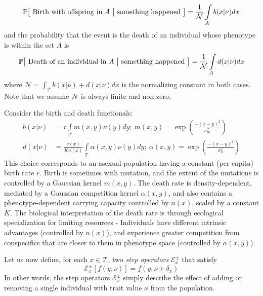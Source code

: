 \begin{equation*}
    \mathbb{P}\big[\textrm{ Birth with offspring in $A$ } \big{|} \textrm{ something happened }\big] = \frac{1}{\mathcal{N}}\int\limits_{A}b(x|\nu)dx
\end{equation*}
and the probability that the event is the death of an individual whose phenotype is within the set $A$ is
\begin{equation*}
    \mathbb{P}\big[\textrm{ Death of an individual in $A$ } \big{|} \textrm{ something happened }\big] = \frac{1}{\mathcal{N}}\int\limits_{A}d(x|\nu)dx
\end{equation*}
where $\mathcal{N} = \int_{\mathcal{T}}b(x|\nu)+d(x|\nu)dx$ is the normalizing constant in both cases. Note that we assume $\mathcal{N}$ is always finite and non-zero.

\begin{example}
Consider the birth and death functionals:
\begin{equation}
\label{Rogers_logistic_BD}
\begin{aligned}
b(x|\nu) &= r\int\limits_{\mathcal{T}}m(x,y)\nu(y)dy; \ m(x,y) = \exp\left(\frac{-(x-y)^2}{\sigma_{m}^{2}}\right)\\
    d(x|\nu) &= \frac{\nu(x)}{Kn(x)}\int\limits_{\mathcal{T}}\alpha(x,y)\nu(y)dy; \ \alpha(x,y) = \exp\left(\frac{-(x-y)^2}{\sigma_{\alpha}^{2}}\right)
\end{aligned}
\end{equation}
This choice corresponds to an asexual population having a constant (per-capita) birth rate $r$. Birth is sometimes with mutation, and the extent of the mutations is controlled by a Gaussian kernel $m(x,y)$. The death rate is density-dependent, mediated by a Gaussian competition kernel $\alpha(x,y)$, and also contains a phenotype-dependent carrying capacity controlled by $n(x)$, scaled by a constant $K$. The biological interpretation of the death rate is through ecological specialization for limiting resources - Individuals have different intrinsic advantages (controlled by $n(x)$), and experience greater competition from conspecifics that are closer to them in phenotype space (controlled by $\alpha(x,y)$).
\end{example}
Let us now define, for each $x \in \mathcal{T}$, two \emph{step operators} $\mathcal{E}_{x}^{\pm}$ that satisfy
\begin{equation*}
    \mathcal{E}_{x}^{\pm}[f(y,\nu)] =  f(y,\nu \pm \delta_x)
\end{equation*}
In other words, the step operators $\mathcal{E}_{x}^{\pm}$ simply describe the effect of adding or removing a single individual with trait value $x$ from the population.
